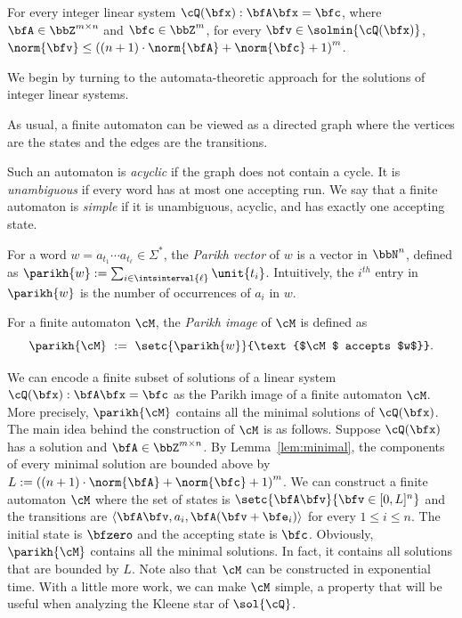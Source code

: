 \begin{lemma}\label{lem:minimal}
    For every integer linear system $\cQ(\bfx): \bfA \bfx = \bfc$,
    where $\bfA \in \bbZ^{m \times n}$ and $\bfc \in \bbZ^{m}$,
    for every $\bfv \in \solmin{\cQ(\bfx)}$,
     $\norm{\bfv} \le \left((n+1)\cdot\norm{\bfA} + \norm{\bfc} + 1\right)^{m}$.
\end{lemma}

We begin by turning to the automata-theoretic approach for the solutions of integer linear systems.

\begin{definition} \label{def:simpleplus}
As usual, a finite automaton can be viewed as a 
directed graph where the vertices are the states
and the edges are the transitions.

Such an automaton is \emph{acyclic} if the graph does not contain a cycle. 
It is \emph{unambiguous} if every word has 
at most one accepting run.
    We say that a finite automaton is \emph{simple}
    if it is unambiguous, acyclic, and has exactly one accepting state.
\end{definition}

\begin{definition}
    For a word $w = a_{t_1}\cdots a_{t_\ell} \in \Sigma^*$,
    the \emph{Parikh vector} of $w$
    is a vector in $\bbN^{n}$, defined as
    $\parikh{w} := \sum_{i \in \intsinterval{\ell}} \unit{t_i}$.
    Intuitively, the $i^{th}$ entry in $\parikh{w}$ is the number of occurrences of $a_i$ in $w$.

For a finite automaton $\cM$, the \emph{Parikh image} of $\cM$ is defined as
\begin{equation*}
\parikh{\cM}
\ :=\ 
\setc{\parikh{w}}{\text{$\cM$ accepts $w$}}.
\end{equation*}
\end{definition}

We can encode a finite subset of solutions of a linear system $\cQ(\bfx):\bfA \bfx = \bfc$ as the Parikh image of a finite automaton $\cM$.
More precisely, $\parikh{\cM}$ contains all the minimal solutions of $\cQ(\bfx)$.
The main idea behind the construction of $\cM$ is as follows.
Suppose $\cQ(\bfx)$ has a solution
and $\bfA\in \bbZ^{m\times n}$.
By Lemma~\ref{lem:minimal},
the components of every minimal solution are bounded above by  
$L:=\left((n+1)\cdot\norm{\bfA} + \norm{\bfc} + 1\right)^{m}$.
We can construct a finite automaton $\cM$ where the set of states is $\setc{\bfA\bfv}{\bfv \in [0,L]^n}$
and the transitions are
$\langle \bfA\bfv,a_i, \bfA(\bfv+\bfe_i) \rangle$ for every $1\le i \le n$.
The initial state is $\bfzero$ and the accepting state is $\bfc$.
Obviously, $\parikh{\cM}$ contains all the minimal solutions. In fact, it contains all solutions that are bounded by $L$. 
Note also that
$\cM$ can be constructed in exponential time.
With a little more work, we can make $\cM$ simple, a property that will be useful when analyzing the Kleene star of $\sol{\cQ}$.

